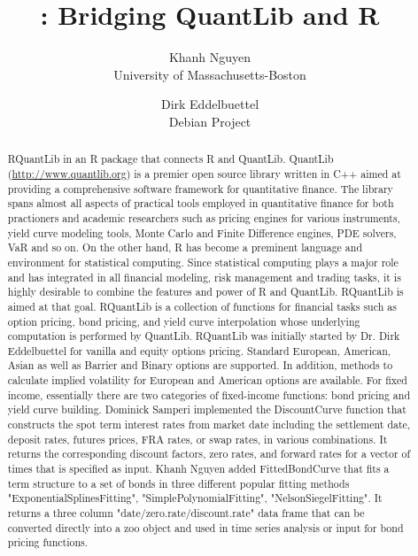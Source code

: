 \documentclass[11pt]{article}
\author{Khanh Nguyen\\University of Massachusetts-Boston \and
       Dirk Eddelbuettel\\Debian Project}
\title{\pkg{RQuantLib}: Bridging QuantLib and R}
\let\proglang=\textsf
\newcommand{\pkg}[1]{{\fontseries{b}\selectfont #1}}
\begin{document}
\maketitle

\begin{abstract}

\noindent
\pkg{RQuantLib} in an R package that connects R and QuantLib. QuantLib
(\url{http://www.quantlib.org}) is a premier open source library written
in \proglang{C++} aimed at providing a comprehensive software framework for
quantitative finance. The library spans almost all aspects of practical tools employed in quantitative finance for both practioners and academic researchers such as pricing engines for various instruments, yield curve modeling tools, Monte Carlo and Finite Difference engines, PDE solvers, VaR and so on. On the other hand, R has become a preminent language and environment for statistical computing. Since statistical computing plays a major role and has integrated in all financial modeling, risk management and trading tasks, it is highly desirable to combine the features and power of R and QuantLib. \pkg{RQuantLib} is aimed at that goal. \pkg{RQuantLib} is a collection of functions for financial tasks such as option pricing, bond pricing, and yield curve interpolation whose underlying computation is performed by QuantLib. 
\newline
\newline
\noindent
RQuantLib was initially started by Dr. Dirk Eddelbuettel for vanilla and equity options pricing. Standard European, American, Asian as well as Barrier and Binary options are supported. In addition, methods to calculate implied volatility for European and American options are available. 
\newline
\newline
\noindent
For fixed income, essentially there are two categories of fixed-income functions: bond pricing and yield curve building. Dominick Samperi implemented the DiscountCurve function that constructs the spot term interest rates from market date including the settlement date, deposit rates, futures prices, FRA rates, or swap rates, in various combinations. It returns the corresponding discount factors, zero rates, and forward rates for a vector of times that is specified as input. Khanh Nguyen added FittedBondCurve that fits a term structure to a set of bonds in three different popular fitting methods "ExponentialSplinesFitting", "SimplePolynomialFitting", "NelsonSiegelFitting". It returns a three column "date/zero.rate/discount.rate" data frame that can be converted directly into a zoo object and used in time series analysis or input for bond pricing functions. 

\end{abstract}
\end{document}
